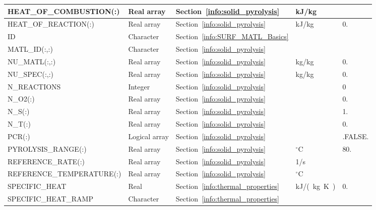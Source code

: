 \documentclass[11pt]{book}
\begin{document}
\begin{longtable}{@{\extracolsep{\fill}}|l|l|l|l|l|}
{\ct HEAT\_OF\_COMBUSTION(:)}       & Real array    & Section~\ref{info:solid_pyrolysis}    & kJ/kg             &        \\ \hline
{\ct HEAT\_OF\_REACTION(:)}         & Real array    & Section~\ref{info:solid_pyrolysis}    & kJ/kg             & 0.     \\ \hline
{\ct ID     }                       & Character     & Section~\ref{info:SURF_MATL_Basics}   &                   &        \\ \hline
{\ct MATL\_ID(:,:)}                 & Character     & Section~\ref{info:solid_pyrolysis}    &                   &        \\ \hline
{\ct NU\_MATL(:,:)}                 & Real array    & Section~\ref{info:solid_pyrolysis}    & kg/kg             & 0.     \\ \hline
{\ct NU\_SPEC(:,:)}                 & Real array    & Section~\ref{info:solid_pyrolysis}    & kg/kg             & 0.     \\ \hline
{\ct N\_REACTIONS}                  & Integer       & Section~\ref{info:solid_pyrolysis}    &                   & 0      \\ \hline
{\ct N\_O2(:)}                      & Real array    & Section~\ref{info:solid_pyrolysis}    &                   & 0.     \\ \hline
{\ct N\_S(:)}                       & Real array    & Section~\ref{info:solid_pyrolysis}    &                   & 1.     \\ \hline
{\ct N\_T(:)}                       & Real array    & Section~\ref{info:solid_pyrolysis}    &                   & 0.     \\ \hline
{\ct PCR(:)}                        & Logical array & Section~\ref{info:solid_pyrolysis}    &                   & {\ct.FALSE.}\\ \hline
{\ct PYROLYSIS\_RANGE(:)}           & Real array    & Section~\ref{info:solid_pyrolysis}    & $^\circ$C         & 80.    \\ \hline
{\ct REFERENCE\_RATE(:)}            & Real array    & Section~\ref{info:solid_pyrolysis}    & 1/s               &        \\ \hline
{\ct REFERENCE\_TEMPERATURE(:)}     & Real array    & Section~\ref{info:solid_pyrolysis}    & $^\circ$C         &        \\ \hline
{\ct SPECIFIC\_HEAT}                & Real          & Section~\ref{info:thermal_properties} & \si{kJ/(kg.K)}    & 0.     \\ \hline
{\ct SPECIFIC\_HEAT\_RAMP}          & Character     & Section~\ref{info:thermal_properties} &                   &        \\ \hline

\end{longtable}
\end{document}
